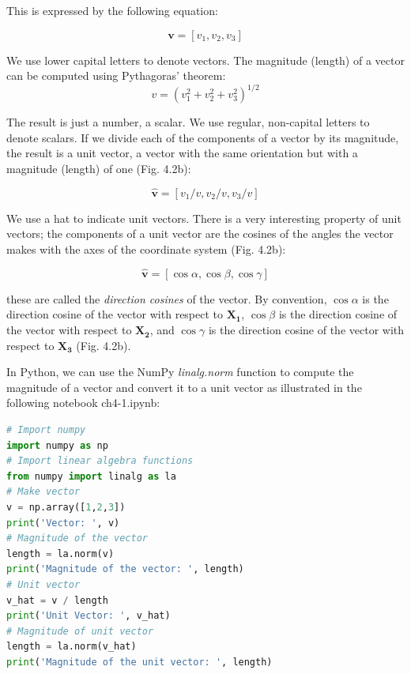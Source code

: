 \documentclass[a4paper , 12pt]{book}
\begin{document}
This is expressed by the following equation:

\begin{equation}
    \mathbf{v} = [v_1,v_2,v_3]
\end{equation}

We use lower capital letters to denote vectors. The magnitude (length) of a vector can be computed using Pythagoras' theorem:
\begin{equation}
    v = (v_1^2+v_2^2+v_3^2)^{1/2}
\end{equation}

The result is just a number, a scalar. We use regular, non-capital letters to denote scalars. If we divide each of the components of a vector by its magnitude, the result is a unit vector, a vector with the same orientation but with a magnitude (length) of one (Fig. 4.2b):

\begin{equation}
    \mathbf{\hat{v}}=[v_1/v,v_2/v,v_3/v]
\end{equation}

We use a hat to indicate unit vectors. There is a very interesting property of unit vectors; the components of a unit vector are the cosines of the angles the vector makes with the axes of the coordinate system (Fig. 4.2b):

\begin{equation}
    \mathbf{\hat v} = [\cos\alpha,\cos\beta,\cos\gamma]
\end{equation}

these are called the \textit{direction cosines} of the vector. By convention, $\cos\alpha$ is the direction cosine of the vector with respect to $\mathbf{X_1}$, $\cos\beta$ is the direction cosine of the vector with respect to $\mathbf{X_2}$, and $\cos\gamma$ is the direction cosine of the vector with respect to $\mathbf{X_3}$ (Fig. 4.2b).

In Python, we can use the NumPy \textit{linalg.norm} function to compute the magnitude of a vector and convert it to a unit vector as illustrated in the following notebook ch4-1.ipynb:

\begin{center}
\begin{lstlisting}[language=Python, frame=single]
# Import numpy
import numpy as np
# Import linear algebra functions
from numpy import linalg as la
# Make vector
v = np.array([1,2,3])
print('Vector: ', v)
# Magnitude of the vector
length = la.norm(v) 
print('Magnitude of the vector: ', length)
# Unit vector
v_hat = v / length
print('Unit Vector: ', v_hat)
# Magnitude of unit vector
length = la.norm(v_hat) 
print('Magnitude of the unit vector: ', length)
\end{lstlisting}
\end{center}
\end{document}
